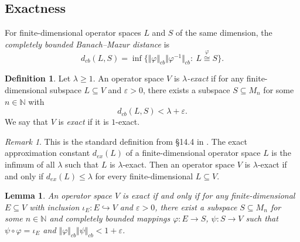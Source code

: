 \documentclass[12pt]{article}
\newtheorem{lemma}[theorem]{Lemma}
\theoremstyle{definition}
\newtheorem{definition}[theorem]{Definition}
\theoremstyle{remark}
\newtheorem{remark}[theorem]{Remark}
\begin{document}
\subsection{Exactness}\label{sec:classical}

For finite-dimensional operator spaces $L$ and $S$ of the same dimension,
the \emph{completely bounded Banach--Mazur distance} is
\begin{equation}\label{eq:dcb}
d_{cb}(L,S)=\inf\bigl\{\Vert\varphi\Vert_{cb}\Vert\varphi^{-1}\Vert_{cb}
:\ L\stackrel{\varphi}{\cong} S\bigr\}.
\end{equation}


\begin{definition}\label{def:exact}
Let $\lambda\ge 1$. An operator space $V$ is \emph{$\lambda$-exact} if
for any finite-dimensional subspace $L\subseteq V$ and
$\varepsilon>0$, there exists a subspace
$S\subseteq M_n$ for some $n\in\mathbb{N}$ with
\begin{equation}\label{eq:exact-dcb}
d_{cb}(L,S)<\lambda+\varepsilon.
\end{equation}
We say that $V$ is \emph{exact} if it is $1$-exact.
\end{definition}


\begin{remark}\label{rem:ER-exact}
This is the standard definition from \S14.4 in \cite{ER00}. The exact
approximation constant $d_{ex}(L)$ of a finite-dimensional operator
space $L$ is the infimum of all $\lambda$ such that $L$ is
$\lambda$-exact. Then an operator space $V$ is $\lambda$-exact
if and only if $d_{ex}(L)\le\lambda$ for every finite-dimensional
$L\subseteq V$.
\end{remark}



\begin{lemma}\label{lem:exact-equiv}
An operator space $V$ is exact if and only if for
any finite-dimensional $E\subseteq V$ with inclusion $\iota_E:E\hookrightarrow V$ and $\varepsilon>0$, there exist a subspace
$S\subseteq M_n$ for some $n\in\mathbb{N}$ and completely bounded mappings $\varphi:E\to S$, $\psi:S\to V$ such that $\psi\circ\varphi=\iota_E$ and $\Vert\varphi\Vert_{cb}\Vert\psi\Vert_{cb}<1+\varepsilon$.
\end{lemma}
\end{document}
